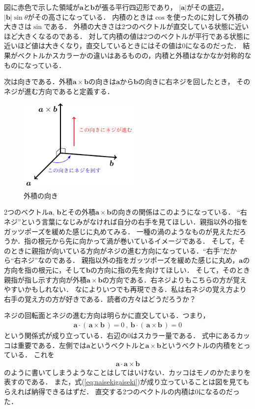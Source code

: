 図に赤色で示した領域が$\bm{a}$と$\bm{b}$が張る平行四辺形であり，
$\lvert \bm{a} \rvert$がその底辺，$\lvert \bm{b} \rvert \sin \theta$がその高さになっている．
内積のときは$\cos$を使ったのに対して外積の大きさは$\sin$である．
外積の大きさは2つのベクトルが直交している状態に近いほど大きくなるのである．
対して内積の値は2つのベクトルが平行である状態に近いほど値は大きくなり，直交しているときにはその値は0になるのだった．
結果がベクトルかスカラーかの違いはあるものの，内積と外積はなかなか対称的なものになっている．

次は向きである．外積$\bm{a} \times \bm{b}$の向きは$\bm{a}$から$\bm{b}$の向きに右ネジを回したとき，
そのネジが進む方向であると定義する．
\begin{figure}[h]
 \centering
 \includegraphics[width=6cm]{picture/vecter3.pdf}
 \caption{外積の向き}
\end{figure}

2つのベクトル$\bm{a}, \, \bm{b}$とその外積$\bm{a} \times \bm{b}$の向きの関係はこのようになっている．
``右ネジ''という言葉になじみがなければ自分の右手を見てほしい．親指以外の指をガッツポーズを緩めた感じに丸めてみる．
一種の渦のようなものが見えただろうか．指の根元から先に向かって渦が巻いているイメージである．
そして，そのときに親指が向いている方向がネジの進む方向になっている．``右手''だから``右ネジ''なのである．
親指以外の指をガッツポーズを緩めた感じに丸め，$\bm{a}$の方向を指の根元に，そして$\bm{b}$の方向に指の先を向けてほしい．
そして，そのとき親指が指し示す方向が外積$\bm{a} \times \bm{b}$の方向である．右ネジよりもこちらの方が覚えやすいかもしれない．
なによりいつでも再現できる．私は右ネジの覚え方より右手の覚え方の方が好きである．読者の方々はどうだろうか？ 

ネジの回転面とネジの進む方向は明らかに直交している．つまり，
\begin{align}
\bm{a} \cdot ( \, \bm{a} \times \bm{b} \, ) = 0 \: , \:  \bm{b} \cdot ( \, \bm{a} \times \bm{b} \, ) =0 
\label{eq:naisekigaiseki}
\end{align}
という関係式が成り立っている．右辺の0はスカラー量である．
式中にあるカッコは重要である．左側では$\bm{a}$というベクトルと$\bm{a} \times \bm{b}$というベクトルの内積をとっている．
これを
\begin{align*}
\bm{a} \cdot \bm{a} \times \bm{b}
\end{align*}
のように書いてしまうようなことはしてはいけない．カッコはモノのかたまりを表すのである．
また，式(\ref{eq:naisekigaiseki})が成り立っていることは図を見てもらえれば納得できるはずだ．
直交する2つのベクトルの内積は0になるのだった．

